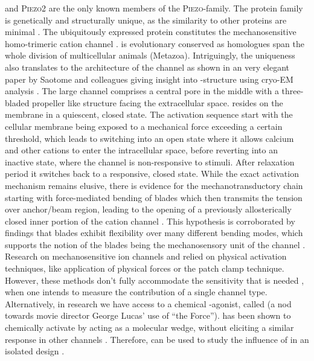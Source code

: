 \Piezo{} and \textsc{Piezo2} are the only known members of the \textsc{Piezo}-family. 
The protein family is genetically and structurally unique, as the similarity to other proteins are minimal \cite{Coste2010}. 
The ubiquitously expressed protein \Piezo{} constitutes the mechanosensitive homo-trimeric cation channel \Piezo{} \cite{Zhao2018}. \Piezo{} is evolutionary conserved as homologues span the whole division of multicellular animals (Metazoa). Intriguingly, the uniqueness also translates to the architecture of the channel as shown in an very elegant paper by Saotome and colleagues giving insight into \Piezo{}-structure using cryo-EM analysis \cite{Saotome2018}. The large channel comprises a central pore in the middle with a three-bladed propeller like structure facing the extracellular space. \Piezo{} resides on the membrane in a quiescent, closed state. The activation sequence start with the cellular membrane being exposed to a mechanical force exceeding a certain threshold, which leads to \Piezo{} switching into an open state where it allows calcium and other cations to enter the intracellular space, before reverting into an inactive state, where the channel is non-responsive to stimuli. After relaxation period it switches back to a responsive, closed state. While the exact activation mechanism remains elusive, there is evidence for the mechanotransductory chain starting with force-mediated bending of blades which then transmits the tension over anchor/beam region, leading to the opening of a previously allosterically closed inner portion of the cation channel \cite{Zhao2018}. This hypothesis is corroborated by findings that blades exhibit flexibility over many different bending modes, which supports the notion of the blades being the mechanosensory unit of the channel \cite{Ge2015}. 
Research on mechanosensitive ion channels and \Piezo{} relied on physical activation techniques, like application of physical forces or the patch clamp technique. However, these methods don’t fully accommodate the sensitivity that is needed , when one intends to measure the contribution of a single channel type. \cite{Dubin2017} Alternatively, in research we have access to a chemical \Piezo{}-agonist, called \Yoda{} (a nod towards movie director George Lucas’ use of “the Force”). \Yoda{} has been shown to chemically activate \Piezo{} by acting as a molecular wedge, without eliciting a similar response in other channels \cite{Syeda2015, Lacroix2018}. Therefore, \Yoda{} can be used to study the influence of \Piezo{} in an isolated design \cite{Botello-Smith2019}.
